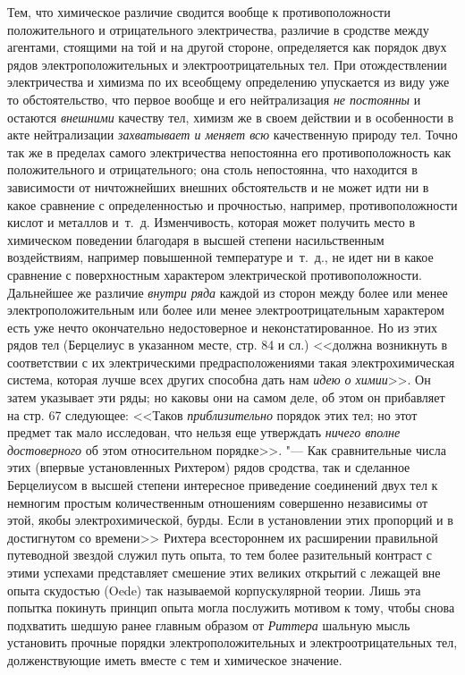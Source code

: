 Тем, что химическое различие сводится вообще к противоположности
положительного и отрицательного электричества, различие в сродстве между
агентами, стоящими на той и на другой стороне, определяется как порядок
двух рядов электроположительных и электроотрицательных тел. При
отождествлении электричества и химизма по их всеобщему определению
упускается из виду уже то обстоятельство, что первое вообще и его
нейтрализация {\em не постоянны} и остаются
{\em внешними} качеству тел, химизм же в своем действии
и в особенности в акте нейтрализации {\em захватывает и
меняет всю} качественную природу тел. Точно так же в пределах самого
электричества непостоянна его противоположность как положительного и
отрицательного; она столь непостоянна, что находится в зависимости от
ничтожнейших внешних обстоятельств и не может идти ни в какое сравнение с
определенностью и прочностью, например, противоположности кислот и металлов
и~т.~д. Изменчивость, которая может получить место в химическом поведении
благодаря в высшей степени насильственным воздействиям, например повышенной
температуре и~т.~д., не идет ни в какое сравнение с поверхностным
характером электрической противоположности. Дальнейшее же различие
{\em внутри ряда} каждой из сторон между более или
менее электроположительным или более или менее электроотрицательным
характером есть уже нечто окончательно недостоверное и неконстатированное.
Но из этих рядов тел (Берцелиус в указанном месте, стр. 84 и сл.) <<должна
возникнуть в соответствии с их электрическими предрасположениями такая
электрохимическая система, которая лучше всех других способна дать нам
{\em идею о химии}>>. Он затем указывает эти ряды; но
каковы они на самом деле, об этом он прибавляет на стр. 67 следующее:
<<Таков {\em приблизительно} порядок этих тел; но этот
предмет так мало исследован, что нельзя еще утверждать
{\em ничего вполне достоверного} об этом относительном
порядке>>. "--- Как сравнительные числа этих (впервые установленных Рихтером)
рядов сродства, так и сделанное Берцелиусом в высшей степени интересное
приведение соединений двух тел к немногим простым количественным отношениям
совершенно независимы от этой, якобы электрохимической, бурды. Если в
установлении этих пропорций и в достигнутом со времени>> Рихтера
всестороннем их расширении правильной путеводной звездой служил путь опыта,
то тем более разительный контраст с этими успехами представляет смешение
этих великих открытий с лежащей вне опыта скудостью (Oede) так называемой
корпускулярной теории. Лишь эта попытка покинуть принцип опыта могла
послужить мотивом к тому, чтобы снова подхватить шедшую ранее главным
образом от {\em Риттера} шальную мысль установить
прочные порядки электроположительных и электроотрицательных тел,
долженствующие иметь вместе с тем и химическое значение.

